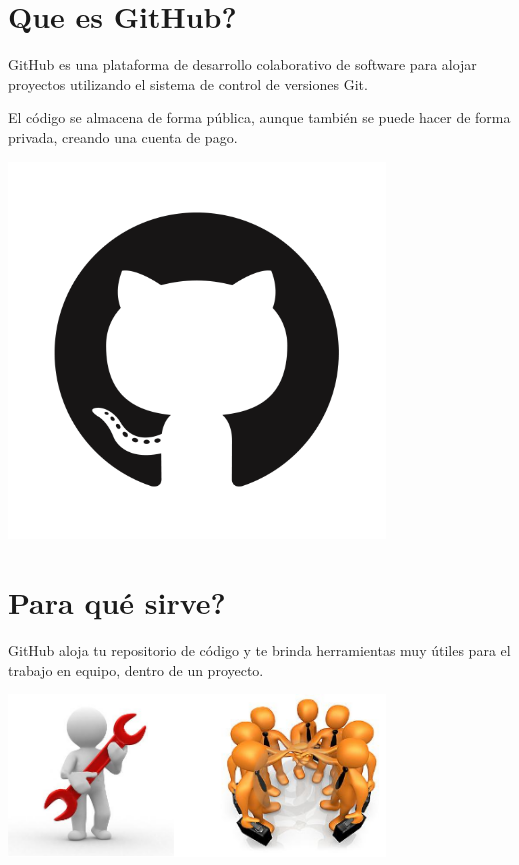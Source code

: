 \section{Que es GitHub?} 

\begin{itemize}
GitHub es una plataforma de desarrollo colaborativo de software para alojar proyectos utilizando el sistema de control de versiones Git.

El código se almacena de forma pública, aunque también se puede hacer de forma privada, creando una cuenta de pago.
\end{itemize} 

\begin{center}
\includegraphics[width=10cm]{./Imagenes/github} 
\end{center}

\section{Para qué sirve?}
\begin{itemize}
GitHub aloja tu repositorio de código y te brinda herramientas muy útiles para el trabajo en equipo, dentro de un proyecto.
\end{itemize} 

\begin{center}
\includegraphics[width=10cm]{./Imagenes/herramienta} 
\end{center}

